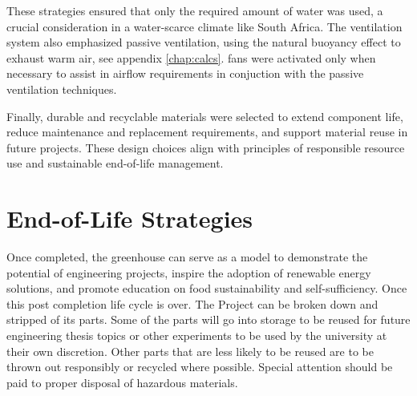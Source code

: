 These strategies ensured that only the required amount of water was used, a crucial consideration in a water-scarce climate like South Africa. The ventilation system also emphasized passive ventilation, using the natural buoyancy effect to exhaust warm air, see appendix \ref{chap:calcs}. fans were activated only when necessary to assist in airflow requirements in conjuction with the passive ventilation techniques.

Finally, durable and recyclable materials were selected to extend component life, reduce maintenance and replacement requirements, and support material reuse in future projects. These design choices align with principles of responsible resource use and sustainable end-of-life management.

\section{End-of-Life Strategies}

Once completed, the greenhouse can serve as a model to demonstrate the potential of engineering projects, inspire the adoption of renewable energy solutions, and promote education on food sustainability and self-sufficiency.
Once this post completion life cycle is over. The Project can be broken down and stripped of its parts. Some of the parts will go into storage to be reused for future engineering thesis topics or other experiments to be used by the university at their own discretion. Other parts that are less likely to be reused are to be thrown out responsibly or recycled where possible. Special attention should be paid to proper disposal of hazardous materials.



